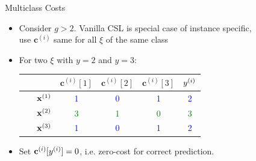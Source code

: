 \documentclass[10pt,compress,t,notes=noshow, xcolor=table]{beamer}
\newcommand{\cv}{\mathbf{c}}
\begin{document}
\begin{frame}{Multiclass Costs}
    \begin{itemize}

        \item Consider $g > 2$. Vanilla CSL is special case of instance specific,\\use $\cv^{(i)}$ same for all $\xi$ of the same class
        
        \vspace{5pt}
        
        \item For two $\xi$ with $y=2$ and $y = 3$: %
                \vspace{5pt}

                \begin{center}
                            \begin{tabular}{cc|cccc}\
        			& & $\cv^{(i)}[1]$ & $\cv^{(i)}[2]$ & $\cv^{(i)}[3]$ & $y^{(i)}$ \\
        			\hline & $\mathbf{x}^{(1)}$ & \textcolor{blue}{1} & \textcolor{blue}{0} & \textcolor{blue}{1} & \textcolor{blue}{2}\\
        			& $\mathbf{x}^{(2)}$ & \textcolor{green}{3} & \textcolor{green}{1} & \textcolor{green}{0} & \textcolor{green}{3}\\
                        & $\mathbf{x}^{(3)}$ & \textcolor{blue}{1} & \textcolor{blue}{0} & \textcolor{blue}{1} & \textcolor{blue}{2}\\
                \end{tabular}
        \end{center}

        \item Set $\cv^{(i)}[\yi] = 0$, i.e. zero-cost for correct prediction.
        \vspace{5pt}
        
            
    \end{itemize}
\end{frame}
\end{document}
